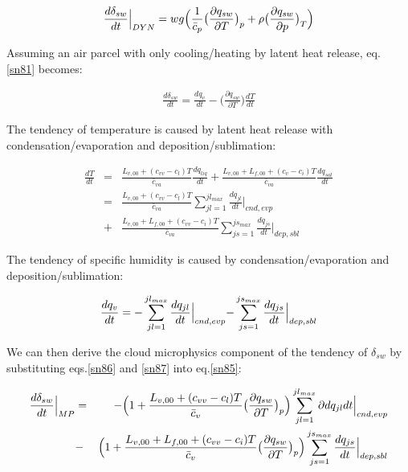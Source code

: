 \begin{eqnarray}
\frac{d\delta_{sw}}{dt}\Bigr|_{DYN}=wg\Bigl(\frac{1}{\bar{c}_{p}}\bigl(\frac{\partial q_{sw}}{\partial T}\bigr)_{p}+\rho\bigl(\frac{\partial q_{sw}}{\partial p}\bigr)_{T}\Bigr)\label{sn84}
\end{eqnarray}

Assuming an air parcel with only cooling/heating by latent heat release, eq. \ref{sn81} becomes:

\begin{eqnarray}
\frac{d\delta_{sw}}{dt}=\frac{dq_{v}}{dt}-\bigl(\frac{\partial q_{sw}}{\partial T}\bigr)\frac{dT}{dt}\label{sn85}
\end{eqnarray}

The tendency of temperature is caused by latent heat release with condensation/evaporation and deposition/sublimation:  %

\begin{eqnarray}
\frac{dT}{dt}&=&\frac{L_{v,00}+(c_{vv}-c_{l})T}{\bar{c}_{va}}\frac{dq_{liq}}{dt}+\frac{L_{v,00}+L_{f,00}+(c_{v}-c_{i})T}{\bar{c}_{va}}\frac{dq_{sol}}{dt}\nonumber\\
&=&\frac{L_{v,00}+(c_{vv}-c_{l}) T}{\bar{c}_{va}} \sum^{jl_{max}}_{jl=1}\frac{dq_{jl}}{dt}\Bigr|_{cnd,evp}\nonumber\\
&+&\frac{L_{v,00}+L_{f,00}+(c_{vv}-c_{i})T}{\bar{c}_{va}}\sum^{js_{max}}_{js=1}\frac{dq_{js}}{dt}\Bigr|_{dep,sbl}\label{sn86}
\end{eqnarray}

The tendency of specific humidity is caused by condensation/evaporation and deposition/sublimation:

\begin{eqnarray}
\frac{dq_{v}}{dt}=-\sum_{jl=1}^{jl_{max}}\frac{dq_{jl}}{dt}\Bigl|_{cnd,evp}-\sum_{js=1}^{js_{max}}\frac{dq_{js}}{dt}\Bigr|_{dep,sbl}\label{sn87}
\end{eqnarray}

We can then derive the cloud microphysics component of the tendency of $\delta_{sw}$ by substituting eqs.\ref{sn86} and \ref{sn87} into eq.\ref{sn85}:

\begin{eqnarray}
\frac{d\delta_{sw}}{dt}\Bigr|_{MP}&=&-\Bigl(1+\frac{L_{v,00}+(c_{vv}-c_{l})T}{\bar{c}_{v}}\bigl(\frac{\partial q_{sw}}{\partial T}\bigr)_{p}\Bigr)\sum_{jl=1}^{jl_{max}}\partial{dq_{jl}}{dt}\Bigr|_{cnd,evp}\nonumber\\
&-&\Bigl(1+\frac{L_{v,00}+L_{f,00}+(c_{vv}-c_{i})T}{\bar{c}_{v}}\bigl(\frac{\partial q_{sw}}{\partial T}\bigr)_{p}\Bigr)\sum^{js_{max}}_{js=1}\frac{dq_{js}}{dt}\Bigr|_{dep,sbl}\label{sn88}
\end{eqnarray}

